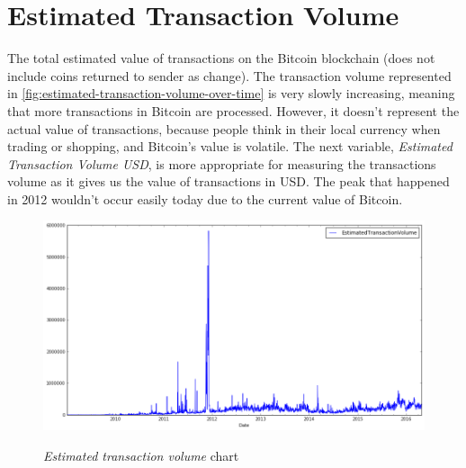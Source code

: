 
\section{Estimated Transaction Volume}
\label{sec:estimated-transaction-volume}


The total estimated value of transactions on the Bitcoin blockchain
(does not include coins returned to sender as change). The transaction
volume represented in
\autoref{fig:estimated-transaction-volume-over-time} is very slowly
increasing, meaning that more transactions in Bitcoin are processed.
However, it doesn't represent the actual value of transactions,
because people think in their local currency when trading or shopping,
and Bitcoin's value is volatile. The next variable, \textit{Estimated
  Transaction Volume USD}, is more appropriate for measuring the
transactions volume as it gives us the value of transactions in USD.
The peak that happened in 2012 wouldn't occur easily today due to the
current value of Bitcoin.

\begin{figure}[bth]
  \myfloatalign
  {\includegraphics[width=1\linewidth]
    {gfx/estimated-transaction-volume-over-time}}
  \caption{\textit{Estimated transaction volume} chart}
  \label{fig:estimated-transaction-volume-over-time}
\end{figure}




